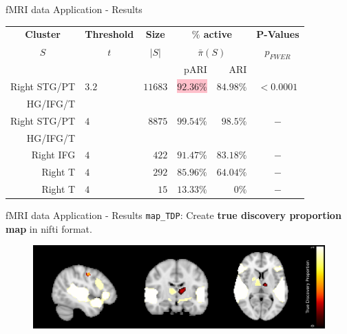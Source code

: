 \documentclass{beamer}
\begin{document}
\begin{frame}{fMRI data Application - Results}
\begin{table}
	\begin{tabular}{@{}rlrrrc@{}}
		\hline
		\multicolumn{1}{c}{\textcolor{bluenight}{\textbf{Cluster}}} &\multicolumn{1}{c}{\textcolor{bluenight}{\textbf{Threshold}}} & \multicolumn{1}{c}{\textcolor{bluenight}{\textbf{Size}}} &\multicolumn{2}{c}{\textcolor{bluenight}{\textbf{$\%$ active}}}& \multicolumn{1}{c}{\textcolor{bluenight}{\textbf{P-Values}}}  \\
		\multicolumn{1}{c}{$S$}&\multicolumn{1}{c}{$t$}  &\multicolumn{1}{c}{$|S|$} & \multicolumn{2}{c}{$\bar{\pi}(S)$}&\multicolumn{1}{c}{$p_{FWER}$}  \\ 
		&  &&pARI  & ARI &   \\ 
		\hline
		Right STG/PT &$3.2$ &$11683$  &   \colorbox{pink}{$92.36\%$} &   $84.98\%$ &$<0.0001$\\
		HG/IFG/T & &      &   &  &\\
		Right STG/PT &$4$ &$8875$  &   $99.54\%$ &   $98.5\%$ &$-$\\
		HG/IFG/T & &  &      &  &\\
		Right IFG &$4$ &$422$  &   $91.47\%$ &   $83.18\%$ &$-$ \\
		Right T & $4$ &  $292$  & $85.96\%$&  $64.04\%$ & $-$\\
		Right T & $4$ &  $15$  & $13.33\%$&  $0\%$ & $-$\\
	\end{tabular}
\end{table}
\end{frame}

\begin{frame}{fMRI data Application - Results}
\texttt{map\_TDP}: Create \textcolor{bluenight}{\textbf{true discovery proportion map}} in nifti format.
\vspace{1cm}
\begin{figure}
	\centering
	\includegraphics[width=\textwidth]{Images/Auditory_tdp.png}
\end{figure}
\end{frame}
\end{document}
